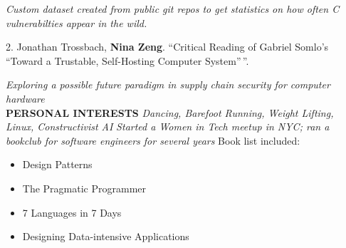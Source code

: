 \documentclass[11pt,a4paper]{article}
\begin{document}
\emph{Custom dataset created from public git repos to get statistics on
how often C vulnerabilties appear in the wild.}

2. Jonathan Trossbach, \textbf{Nina Zeng}. ``Critical Reading of Gabriel
Somlo's ``Toward a Trustable, Self-Hosting Computer System''\,''.

\emph{Exploring a possible future paradigm in supply chain security for
computer hardware}
\\
\textbf{PERSONAL INTERESTS}
\emph{Dancing, Barefoot Running, Weight Lifting, Linux, Constructivist
AI}
\emph{Started a Women in Tech meetup in NYC; ran a bookclub for software
engineers for several years} Book list included:
\begin{itemize}
\item Design Patterns
\item The Pragmatic Programmer
\item 7 Languages in 7 Days
\item Designing Data-intensive Applications
\end{itemize}
\end{document}

